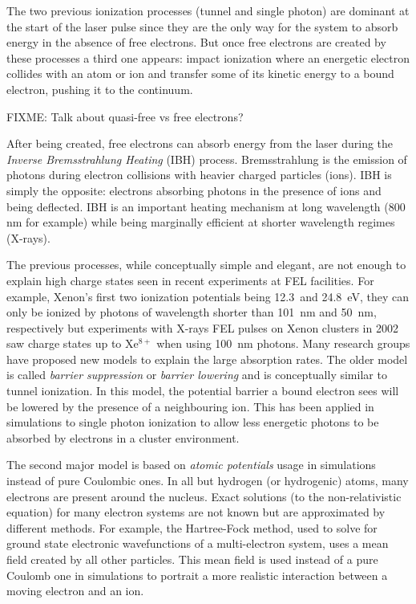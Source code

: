 The two previous ionization processes (tunnel and single photon) are dominant
at the start of the laser pulse since they are the only way for the system to
absorb energy in the absence of free electrons. But once free electrons are
created by these processes a third one appears: impact ionization where an
energetic electron collides with an atom or ion and transfer some of its
kinetic energy to a bound electron, pushing it to the continuum.

FIXME: Talk about quasi-free vs free electrons?

After being created, free electrons can absorb energy from
the laser during the \textit{Inverse Bremsstrahlung Heating} (IBH) process.
Bremsstrahlung is the emission of photons during electron collisions with
heavier charged particles (ions). IBH is simply the opposite: electrons
absorbing photons in the presence of ions and being deflected. IBH is
an important heating mechanism at long wavelength (800 nm for example) while
being marginally efficient at shorter wavelength regimes (X-rays)\citeneeded.

The previous processes, while conceptually simple and elegant, are not
enough to explain high charge states seen in recent experiments at FEL
facilities. For example, Xenon's first two ionization potentials being 12.3~and
24.8~eV, they can only be ionized by photons of wavelength shorter than
101~nm and
50~nm, respectively but experiments with X-rays FEL pulses on Xenon clusters in
2002 saw
charge states up to Xe$^{8+}$ when using 100~nm photons\cite{Wabnitz2002}.
Many research groups have proposed new models to
explain the large absorption rates. The older model is called \textit{barrier
suppression} or \textit{barrier lowering} and is conceptually similar to tunnel
ionization. In this model, the potential barrier a bound electron sees will be
lowered by the presence of a neighbouring ion. This has been applied in
simulations to single photon ionization to allow less energetic photons to be
absorbed by electrons in a cluster environment\cite{Siedschlag2004}.

The second major model is based on \textit{atomic potentials} usage in
simulations instead of pure Coulombic ones. In all but hydrogen (or hydrogenic)
atoms, many electrons are present around the nucleus. Exact solutions (to the
non-relativistic \schrodinger equation) for many electron systems are not known
but are approximated by different methods. For example, the Hartree-Fock
method, used to solve for ground state electronic wavefunctions of a
multi-electron system, uses a mean field created by all other particles. This
mean field is used instead of a pure Coulomb one in simulations to portrait a
more realistic interaction between a moving electron and an
ion\cite{Greene2003}.

